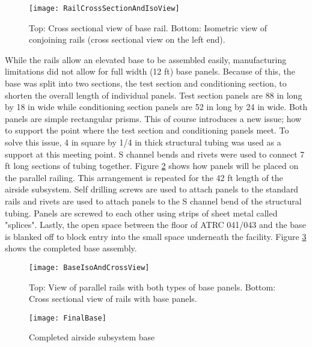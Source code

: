 \begin{figure}[h]
\centering
\texttt{[image: RailCrossSectionAndIsoView]}
\caption{Top: Cross sectional view of base rail. Bottom: Isometric view of conjoining rails (cross sectional view on the left end).}
\label{fig:RailDescription}
\end{figure}

While the rails allow an elevated base to be assembled easily, manufacturing limitations did not allow for full width (12 ft) base panels. Because of this, the base was split into two sections, the test section and conditioning section, to shorten the overall length of individual panels. Test section panels are 88 in long by 18 in wide while conditioning section panels are 52 in long by 24 in wide. Both panels are simple rectangular prisms. This of course introduces a new issue; how to support the point where the test section and conditioning panels meet. To solve this issue, 4 in square by 1/4 in thick structural tubing was used as a support at this meeting point. S channel bends and rivets were used to connect 7 ft long sections of tubing together. Figure \ref{fig:BaseIsoAndCrossView} shows how panels will be placed on the parallel railing. This arrangement is repeated for the 42 ft length of the airside subsystem. Self drilling screws are used to attach panels to the standard rails and rivets are used to attach panels to the S channel bend of the structural tubing. Panels are screwed to each other using strips of sheet metal called "splices". Lastly, the open space between the floor of ATRC 041/043 and the base is blanked off to block entry into the small space underneath the facility. Figure \ref{fig:FinalBase} shows the completed base assembly. 

\begin{figure}[h]
\centering
\texttt{[image: BaseIsoAndCrossView]}
\caption{Top: View of parallel rails with both types of base panels. Bottom: Cross sectional view of rails with base panels.} 
\label{fig:BaseIsoAndCrossView}
\end{figure}

\begin{figure}[h!]
\centering
\texttt{[image: FinalBase]}
\caption{Completed airside subsystem base} 
\label{fig:FinalBase}
\end{figure}

\FloatBarrier

